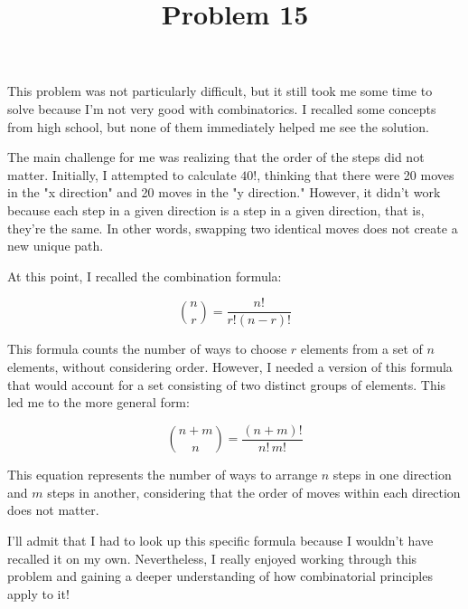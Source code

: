 \documentclass{article}
\begin{document}
\title{Problem 15}
\maketitle

This problem was not particularly difficult, but it still took me some time to solve because I'm not very good with combinatorics. I recalled some concepts from high school, but none of them immediately helped me see the solution.

The main challenge for me was realizing that the order of the steps did not matter. Initially, I attempted to calculate $ 40! $, thinking that there were 20 moves in the "x direction" and 20 moves in the "y direction." However, it didn't work because each step in a given direction is a step in a given direction, that is, they're the same. In other words, swapping two identical moves does not create a new unique path.

At this point, I recalled the combination formula:

$$
\binom{n}{r} = \frac{n!}{r!(n-r)!}
$$

This formula counts the number of ways to choose \( r \) elements from a set of \( n \) elements, without considering order. However, I needed a version of this formula that would account for a set consisting of two distinct groups of elements. This led me to the more general form:

$$
\binom{n+m}{n} = \frac{(n+m)!}{n! \, m!}
$$

This equation represents the number of ways to arrange \( n \) steps in one direction and \( m \) steps in another, considering that the order of moves within each direction does not matter.

I'll admit that I had to look up this specific formula because I wouldn’t have recalled it on my own. Nevertheless, I really enjoyed working through this problem and gaining a deeper understanding of how combinatorial principles apply to it!
\end{document}

